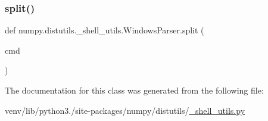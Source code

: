 \mbox{\label{classnumpy_1_1distutils_1_1__shell__utils_1_1WindowsParser_a1c754670bd88bd6d9615e828d89c8dba}} 
\subsubsection{\texorpdfstring{split()}{split()}}
{\footnotesize\ttfamily def numpy.\+distutils.\+\_\+shell\+\_\+utils.\+Windows\+Parser.\+split (\begin{DoxyParamCaption}\item[{}]{cmd }\end{DoxyParamCaption})\hspace{0.3cm}{\ttfamily [static]}}



The documentation for this class was generated from the following file\+:\begin{DoxyCompactItemize}
\item 
venv/lib/python3./site-\/packages/numpy/distutils/\hyperlink{__shell__utils_8py}{\+\_\+shell\+\_\+utils.\+py}\end{DoxyCompactItemize}

